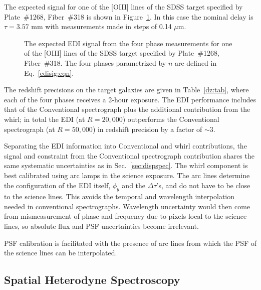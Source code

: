 \documentclass[preprint2, 10pt]{aastex}
\begin{document}
{The expected signal for one of the [OIII] lines of the SDSS target specified by Plate~\#1268, Fiber~\#318 is shown
in Figure~\ref{edicounts:fig}.   In this case the nominal delay is $\tau = 3.57$ mm with measurements
made in steps of 0.14 $\mu$m.


\begin{figure}[t]
   \centering
   \caption{The expected EDI signal from the four phase measurements for one of the [OIII] lines of
   the SDSS target specified by Plate~\#1268, Fiber~\#318. The four phases parametrized by $n$ are defined in Eq.~\ref{edisig:eqn}.
\label{edicounts:fig}}
\end{figure}


The redshift precisions on the target galaxies are given in Table~\ref{dz:tab}, where each of the four phases receives
a 2-hour exposure.  The EDI performance includes that of the Conventional spectrograph plus
the additional contribution from the whirl; in total the EDI (at $R=20,000$) outperforms the Conventional spectrograph (at $R=50,000$) 
in redshift precision by a factor of $\sim 3$. 

Separating the EDI information into Conventional and whirl contributions,
the signal and constraint from the Conventional spectrograph contribution shares the same systematic uncertainties as in Sec.~\ref{sec:dispspec}. 
The whirl component is best calibrated using arc lamps in the science exposure.  
The arc lines determine the configuration
of the EDI itself, $\phi_y$ and the $\Delta \tau$'s, and do not have to be close
to the science lines.  This avoids the temporal and wavelength interpolation needed in conventional spectrographs.
Wavelength uncertainty would then come from mismeasurement of phase and frequency due to pixels local to the
science lines, so absolute flux and PSF uncertainties become irrelevant. 

PSF calibration is facilitated with the presence of arc lines from which the
PSF  of the science lines can be interpolated.


\subsection{Spatial Heterodyne Spectroscopy}
\label{SHS:sec} 

}
\end{document}
